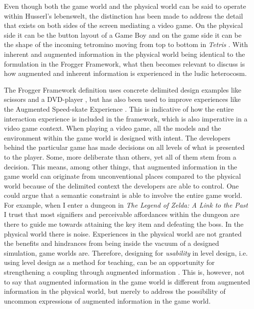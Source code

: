 Even though both the game world and the physical world can be said to operate within Husserl's lebenswelt, the distinction has been made to address the detail that exists on both sides of the screen mediating a video game. On the physical side it can be the button layout of a Game Boy and on the game side it can be the shape of the incoming tetromino moving from top to bottom in \textit{Tetris} \cite{tetris}. With inherent and augmented information in the physical world being identical to the formulation in the Frogger Framework, what then becomes relevant to discuss is how augmented and inherent information is experienced in the ludic heterocosm.

The Frogger Framework definition uses concrete delimited design examples like scissors and a DVD-player \cite{frogger}, but has also been used to improve experiences like the Augmented Speed-skate Experience \cite{transbehav}. This is indicative of how the entire interaction experience is included in the framework, which is also imperative in a video game context. When playing a video game, all the models and the environment within the game world is designed with intent. The developers behind the particular game has made decisions on all levels of what is presented to the player. Some, more deliberate than others, yet all of them stem from a decision. This means, among other things, that augmented information in the game world can originate from unconventional places compared to the physical world because of the delimited context the developers are able to control. One could argue that a semantic constraint is able to involve the entire game world. For example, when I enter a dungeon in \textit{The Legend of Zelda: A Link to the Past} \cite{linktothepast} I trust that most signifiers and perceivable affordances within the dungeon are there to guide me towards attaining the key item and defeating the boss. In the physical world there is noise. Experiences in the physical world are not granted the benefits and hindrances from being inside the vacuum of a designed simulation, game worlds are. Therefore, designing for \textit{usability} in level design, i.e. using level design as a method for teaching, can be an opportunity for strengthening a coupling through augmented information \cite{totten}. This is, however, not to say that augmented information in the game world is different from augmented information in the physical world, but merely to address the possibility of uncommon expressions of augmented information in the game world.

